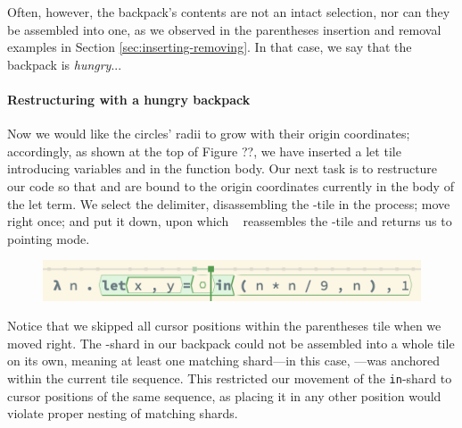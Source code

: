
Often, however, the backpack's contents are not an intact
selection, nor can they be assembled into one, as we observed
in the parentheses insertion and removal examples in Section \ref{sec:inserting-removing}.
In that case, we say that the backpack is \emph{hungry}...

\paragraph{Restructuring with a hungry backpack}

Now we would like the circles' radii to grow
with their origin coordinates; accordingly,
as shown at the top of Figure ??,
we have inserted
a let tile introducing variables  and 
in the function body.
Our next task is to restructure our code so that 
and  are bound to the origin coordinates
 currently in the body of the let term.
We select the  delimiter,
disassembling the -tile in the process;
move right once; and put it down,
upon which \tylr~ reassembles the -tile
and returns us to pointing mode.

\begin{figure}[h]
  \centering
  \includegraphics[width=0.9\columnwidth]{img/placeholder-restructuring-hungry.png}
\end{figure}



Notice that we skipped all cursor positions within
the parentheses tile when we moved right.
The -shard in our backpack could not be assembled into
a whole tile on its own, meaning at least one matching shard---in
this case, ---was
anchored within the current tile sequence.
This restricted our movement of the \texttt{in}-shard
to cursor positions of the same sequence,
as placing it in any other position would
violate proper nesting of matching shards.

